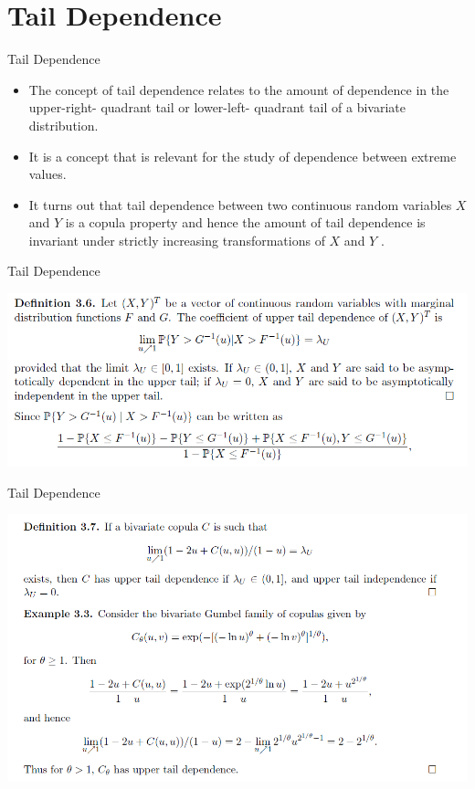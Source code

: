 \documentclass[11pt]{beamer}
\theoremstyle{plain}
\theoremstyle{definition}
\theoremstyle{remark}
\begin{document}
\section{Tail Dependence}
%
\begin{frame}{Tail Dependence}
   \begin{itemize}
		\item The concept of tail dependence relates to the amount of dependence in the upper-right- quadrant tail or lower-left-
		quadrant tail of a bivariate distribution. 
		\item It is a concept that is relevant for the study of dependence between extreme values. 
		\item It turns out that tail dependence between two continuous random variables $X$ and $Y$ is a copula property and hence 
		the amount of tail dependence is invariant under strictly increasing transformations of $X$ and $Y$ .
	\end{itemize}
\end{frame}
%
\begin{frame}{Tail Dependence}
\begin{center}
\includegraphics[scale=.5]{fig/tail_1.PNG} 
\end{center}
\end{frame}
%
\begin{frame}{Tail Dependence}
\begin{center}
\includegraphics[scale=.5]{fig/tail_2.PNG} 
\end{center}
\end{frame}
\end{document}
